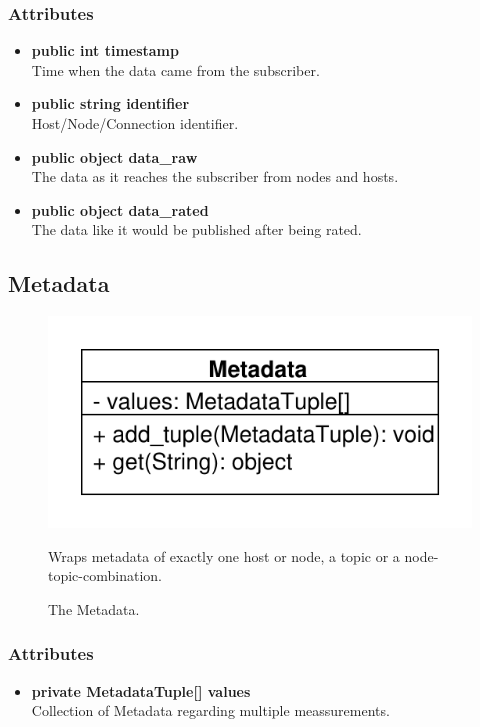 \subsubsection{Attributes}
\begin{itemize}
	\item \textbf{public int timestamp}\\
	Time when the data came from the subscriber.
	\item \textbf{public string identifier}\\
	Host/Node/Connection identifier.
	\item \textbf{public object data\_raw}\\
	The data as it reaches the subscriber from nodes and hosts.
	\item \textbf{public object data\_rated}\\
	The data like it would be published after being rated.
\end{itemize}


\subsection{Metadata}
\begin{figure}[htbp]
	\begin{minipage}[t]{7cm}
		\vspace{0pt}
		\centering
		\includegraphics[scale=0.6]{./diagram_pictures/Metadata.pdf}
		\caption{The Metadata.}
	\end{minipage}
	\hfill
	\begin{minipage}[t]{8cm}
		\vspace{10pt}
		Wraps metadata of exactly one host or node, a topic or a node-topic-combination.
	\end{minipage}
\end{figure}

\subsubsection{Attributes}
\begin{itemize}
	\item \textbf{private MetadataTuple[] values}\\
	Collection of Metadata regarding multiple meassurements.
\end{itemize}
